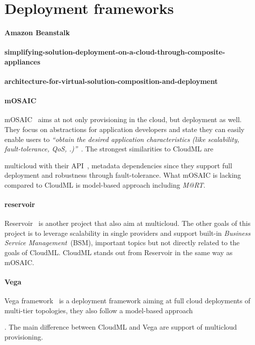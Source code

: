 \section{Deployment frameworks}

\paragraph{Amazon Beanstalk}
\paragraph{simplifying-solution-deployment-on-a-cloud-through-composite-appliances}
\paragraph{architecture-for-virtual-solution-composition-and-deployment}

\paragraph{mOSAIC}

mOSAIC~\cite{portable:petcu12} aims at not only provisioning in the cloud, but deployment as well.
They focus on abstractions for application developers and state they can easily enable users to
\emph{``obtain the desired application characteristics (like
scalability, fault-tolerance, QoS, \etc.)''}~\cite{architecturing:petcu11}.
The strongest similarities to CloudML are 
\begin{ii}\iitem multicloud with their API~\cite{architecturing:petcu11},
\iitem metadata dependencies since they support full deployment and
\iitem robustness through fault-tolerance.
What mOSAIC is lacking compared to CloudML is model-based approach including \emph{M@RT}.

\paragraph{reservoir}

Reservoir~\cite{reservoir:rochweger09} is another project that also aim at
\iitem multicloud. The other goals of this project is to leverage 
scalability in single providers and support built-in \emph{Business Service Management}~(BSM),
important topics but not directly related to the goals of CloudML.
CloudML stands out from Reservoir in the same way as mOSAIC.

\paragraph{Vega}
Vega framework~\cite{simplifying:chieu10} is a deployment framework aiming 
at full cloud deployments of multi-tier topologies, they also follow a \iitem model-based 
approach\end{ii}. The main difference between CloudML and Vega are support of multicloud provisioning.


